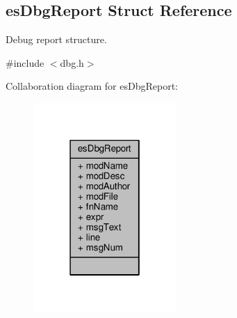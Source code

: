 \hypertarget{structesDbgReport}{\subsection{es\-Dbg\-Report Struct Reference}
\label{structesDbgReport}
}


Debug report structure.  




{\ttfamily \#include $<$dbg.\-h$>$}



Collaboration diagram for es\-Dbg\-Report\-:\nopagebreak
\begin{figure}[H]
\begin{center}
\leavevmode
\includegraphics[width=154pt]{structesDbgReport__coll__graph}
\end{center}
\end{figure}
